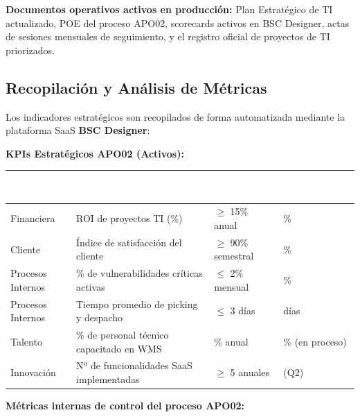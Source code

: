\documentclass[11pt]{article}
\newcounter{none} %
\begin{document}
\textbf{Documentos operativos activos en producción:} Plan Estratégico de TI actualizado, POE del proceso APO02, scorecards activos en BSC Designer, actas de sesiones mensuales de seguimiento, y el registro oficial de proyectos de TI priorizados.

\subsection{Recopilación y Análisis de Métricas}
Los indicadores estratégicos son recopilados de forma automatizada mediante la plataforma SaaS \textbf{BSC Designer}:

\textbf{KPIs Estratégicos APO02 (Activos):}

\vspace{0.3cm}
\setlength{\tabcolsep}{5pt}
\renewcommand{\arraystretch}{1.5}
{\def\LTcaptype{none}
\begin{longtable}[]{@{}
  >{\raggedright\arraybackslash}p{0.18\linewidth}
  >{\raggedright\arraybackslash}p{0.40\linewidth}
  >{\raggedright\arraybackslash}p{0.20\linewidth}
  >{\raggedright\arraybackslash}p{0.22\linewidth}@{}}
\rowcolor{DeepNavy}
\textcolor{white}{\textbf{Perspectiva}} & \textcolor{white}{\textbf{Indicador KPI}} & \textcolor{white}{\textbf{Meta SMART}} & \textcolor{white}{\textbf{Valor Actual (Ej.)}} \\ \hline
\endhead
\rowcolor{LightGray}
Financiera & ROI de proyectos TI (\%) & $\ge$ 15\% anual & 16.2\% \\ \hline
Cliente & Índice de satisfacción del cliente & $\ge$ 90\% semestral & 92.5\% \\ \hline
\rowcolor{LightGray}
Procesos Internos & \% de vulnerabilidades críticas activas & $\le$ 2\% mensual & 1.5\% \\ \hline
Procesos Internos & Tiempo promedio de picking y despacho & $\le$ 3 días & 2.6 días \\ \hline
\rowcolor{LightGray}
Talento & \% de personal técnico capacitado en WMS & 100\% anual & 95\% (en proceso) \\ \hline
Innovación & Nº de funcionalidades SaaS implementadas & $\ge$ 5 anuales & 3 (Q2) \\ \hline
\end{longtable}
}

\textbf{Métricas internas de control del proceso APO02:}
\end{document}
